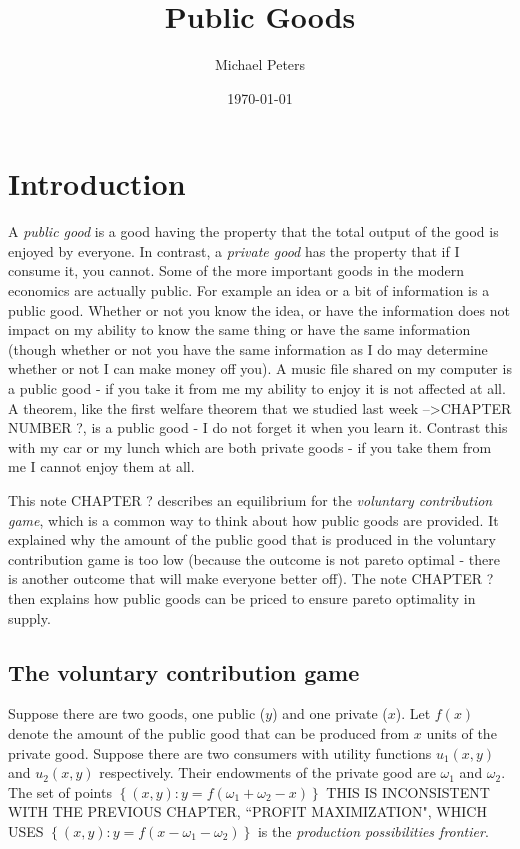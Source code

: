 \documentclass{article}
\begin{document}
\title{Public Goods}
\author{Michael Peters}
\date{\today}
\maketitle

\section{Introduction}
A \emph{public good} is a good having the property that the total output of
the good is enjoyed by everyone. In contrast, a \emph{private good} has the
property that if I consume it, you cannot. Some of the more important goods in
the modern economics are actually public. For example an idea or a bit of
information is a public good. Whether or not you know the idea, or have the
information does not impact on my ability to know the same thing or have the
same information (though whether or not you have the same information as I do
may determine whether or not I can make money off you). A music file shared on
my computer is a public good - if you take it from me my ability to enjoy it
is not affected at all. A theorem, like the first welfare theorem that we
studied last week -->CHAPTER NUMBER ?, is a public good - I do not forget it when you learn it.
Contrast this with my car or my lunch which are both private goods - if you
take them from me I cannot enjoy them at all.

This note CHAPTER ? describes an equilibrium for the \emph{voluntary contribution game},
which is a common way to think about how public goods are provided. It
explained why the amount of the public good that is produced in the voluntary
contribution game is too low (because the outcome is not pareto optimal -
there is another outcome that will make everyone better off). The note CHAPTER ? then
explains how public goods can be priced to ensure pareto optimality in supply.

\subsection{The voluntary contribution game}

Suppose there are two goods, one public ($y$) and one private ($x$). Let
$f\left(  x\right)  $ denote the amount of the public good that can be
produced from $x$ units of the private good. Suppose there are two consumers
with utility functions $u_{1}\left(  x,y\right)  $ and $u_{2}\left(
x,y\right)  $ respectively. Their endowments of the private good are
$\omega_{1}$ and $\omega_{2}$. The set of points $\left\{  \left(  x,y\right)
:y=f\left(  \omega_{1}+\omega_{2}-x\right)  \right\}  $ THIS IS INCONSISTENT WITH THE PREVIOUS CHAPTER, ``PROFIT MAXIMIZATION", WHICH USES $\left\{  \left(  x,y\right)
:y=f\left( x -\omega_{1}-\omega_{2}\right)  \right\}  $ is the
\emph{production possibilities frontier}.
\end{document}
